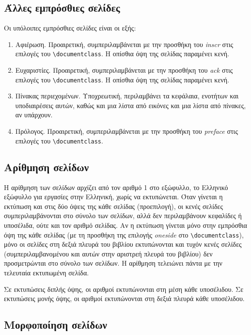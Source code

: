 \documentclass[inscr,ack,preface]{dimscthesis}
\begin{document}
\subsection{Άλλες εμπρόσθιες σελίδες} \label{other_front_matter_pages}

Οι υπόλοιπες εμπρόσθιες σελίδες είναι οι εξής:

\begin{enumerate}
    \item Αφιέρωση.
    Προαιρετική, συμπεριλαμβάνεται με την προσθήκη του \emph{inscr} στις επιλογές του \verb|\documentclass|.
    Η οπίσθια όψη της σελίδας παραμένει κενή.
    \item Ευχαριστίες.
    Προαιρετική, συμπεριλαμβάνεται με την προσθήκη του \emph{ack} στις επιλογές του \verb|\documentclass|.
    Η οπίσθια όψη της σελίδας παραμένει κενή.
    \item Πίνακας περιεχομένων.
    Υποχρεωτική, περιλαμβάνει τα κεφάλαια, ενοτήτων και υποδιαιρέσεις αυτών, καθώς και μια λίστα από εικόνες και μια λίστα από πίνακες, αν υπάρχουν.
    \item Πρόλογος.
    Προαιρετική, συμπεριλαμβάνεται με την προσθήκη του \emph{preface} στις επιλογές του \verb|\documentclass|.
\end{enumerate}

\subsection{Αρίθμηση σελίδων} \label{page_numbering}

Η αρίθμηση των σελίδων αρχίζει από τον αριθμό 1 στο εξώφυλλο, το Ελληνικό εξώφυλλο για εργασίες στην Ελληνική, χωρίς να εκτυπώνεται.
Όταν γίνεται η εκτύπωση και στις δύο όψεις της κάθε σελίδας (προεπιλογή), οι κενές σελίδες συμπεριλαμβάνονται στο σύνολο των σελίδων, αλλά δεν περιλαμβάνουν κεφαλίδες ή υποσέλιδα, ούτε και τον αριθμό σελίδας.
Αν η εκτύπωση γίνεται μόνο στην εμπρόσθια όψη της κάθε σελίδας (με τη προσθήκη της επιλογής \emph{oneside} στο \verb|\documentclass|), μόνο οι σελίδες στη δεξιά πλευρά του βιβλίου εκτυπώνονται και τυχόν κενές σελίδες (συμπεριλαμβανομένου και αυτών στην αριστρεή πλευρά του βιβλίου) δεν προσμετρώνται στο σύνολο των σελίδων.
Η αρίθμηση τελειώνει πάντα με την τελευταία εκτυπωμένη σελίδα.

Σε εκτυπώσεις διπλής όψης, οι αριθμοί εκτυπώνονται στη μέση κάθε υποσέλιδου.
Σε εκτυπώσεις μονής όψης, οι αριθμοί εκτυπώνονται στη δεξιά πλευρά κάθε υποσέλιδου.

\subsection{Μορφοποίηση σελίδων} \label{page_formatting}
\end{document}
